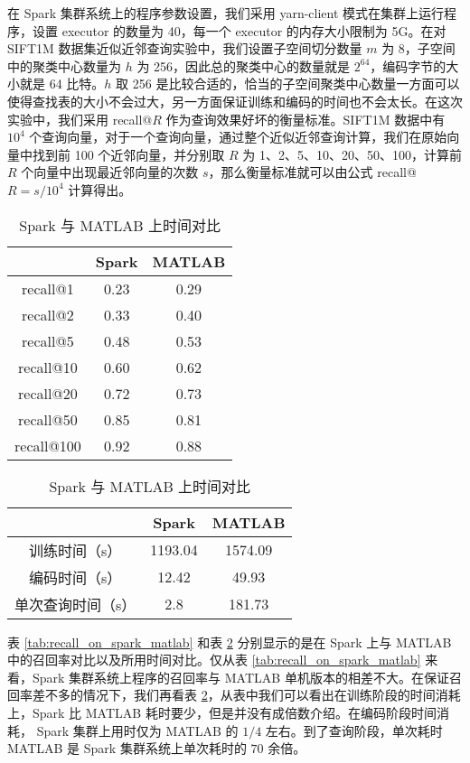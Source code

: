 在 Spark 集群系统上的程序参数设置，我们采用 yarn-client 模式在集群上运行程序，设置 executor 的数量为 40，每一个 executor 的内存大小限制为 5G。在对 SIFT1M 数据集近似近邻查询实验中，我们设置子空间切分数量 $m$ 为 8，子空间中的聚类中心数量为 $h$ 为 256，因此总的聚类中心的数量就是 $2^64$，编码字节的大小就是 64 比特。$h$ 取 256 是比较合适的，恰当的子空间聚类中心数量一方面可以使得查找表的大小不会过大，另一方面保证训练和编码的时间也不会太长。在这次实验中，我们采用 recall@$R$ 作为查询效果好坏的衡量标准。SIFT1M 数据中有 $10^4$ 个查询向量，对于一个查询向量，通过整个近似近邻查询计算，我们在原始向量中找到前 100 个近邻向量，并分别取 $R$ 为 1、2、5、10、20、50、100，计算前 $R$ 个向量中出现最近邻向量的次数 $s$，那么衡量标准就可以由公式 recall@$R = s/10^4$ 计算得出。
\begin{table}[htbp]
\noindent\begin{minipage}{0.5\textwidth}
\centering
\caption{Spark 与 MATLAB 上召回率对比}
\label{tab:recall_on_spark_matlab}
\begin{tabular}{ccc}
\toprule[1.5pt]
    & Spark & MATLAB\\
  \hline
  recall@1  &  0.23   & 0.29\\
  recall@2  &  0.33 &   0.40\\
  recall@5  &  0.48 &   0.53\\
  recall@10  & 0.60 &   0.62\\
  recall@20  &  0.72&  0.73\\
  recall@50  &  0.85 &  0.81\\
  recall@100  & 0.92 &  0.88\\
\bottomrule[1.5pt]
    \end{tabular}
\end{minipage}
\begin{minipage}{0.5\textwidth}
\centering
\caption{Spark 与 MATLAB 上时间对比}
\label{tab:time_on_spark_matlab}
\begin{tabular}{ccc}
\toprule[1.5pt]
    & Spark & MATLAB \\
\hline
训练时间（s） & 1193.04 & 1574.09  \\
编码时间（s） & 12.42 & 49.93 \\
单次查询时间（s）& 2.8 & 181.73 \\
\bottomrule[1.5pt]
\end{tabular}
\end{minipage}
\end{table}
表 \ref{tab:recall_on_spark_matlab} 和表 \ref{tab:time_on_spark_matlab} 分别显示的是在 Spark 上与 MATLAB 中的召回率对比以及所用时间对比。仅从表 \ref{tab:recall_on_spark_matlab} 来看，Spark 集群系统上程序的召回率与 MATLAB 单机版本的相差不大。在保证召回率差不多的情况下，我们再看表  \ref{tab:time_on_spark_matlab}，从表中我们可以看出在训练阶段的时间消耗上，Spark 比 MATLAB 耗时要少，但是并没有成倍数介绍。在编码阶段时间消耗， Spark 集群上用时仅为 MATLAB 的 $1/4$ 左右。到了查询阶段，单次耗时 MATLAB 是 Spark 集群系统上单次耗时的 $70$ 余倍。
